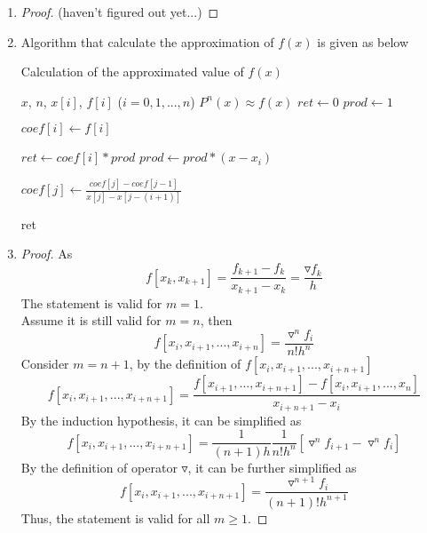 \documentclass[paper=a4, fontsize=11pt]{scrartcl} %
\numberwithin{equation}{section} %
\numberwithin{figure}{section} %
\numberwithin{table}{section} %
\begin{document}
\begin{enumerate}
		\item 
			\begin{proof}
				(haven't figured out yet...)
			\end{proof}
		
		\item 
			Algorithm that calculate the approximation of $f(x)$ is given as below
			
			\begin{algorithm}
			\caption{Calculation of the approximated value of $f(x)$}
			\begin{algorithmic}[1]
				\REQUIRE $x$, $n$, $x[i]$, $f[i]$ ($i = 0, 1, ... , n$)
				\ENSURE $P^n(x) \approx f(x)$
				\STATE $ret \gets 0$
				\STATE $prod \gets 1$
				
					\STATE $coef[i] \gets f[i]$
				\ENDFOR

					\STATE $ret \gets coef[i] * prod$
					\STATE $prod \gets prod * (x-x_i)$

						\STATE $coef[j] \gets \frac{coef[j] - coef[j-1]}{x[j] - x[j-(i+1)]}$
					\ENDFOR

				\ENDFOR

				\RETURN ret
			\end{algorithmic}  
			\end{algorithm}
		\item 
			\begin{proof}
				As
				\begin{equation}
					f[x_k, x_{k+1}] = \frac{f_{k+1}-f_k}{x_{k+1} - x_k} = \frac{\triangledown f_k}{h}
				\end{equation}
				The statement is valid for $m = 1$.\\
				Assume it is still valid for $m = n$, then
				\begin{equation}
					f[x_i, x_{i+1}, ... , x_{i+n}] = \frac{\triangledown^n f_i}{n! h^n}
				\end{equation}
				Consider $m = n+1$, by the definition of $f[x_i, x_{i+1}, ... , x_{i+n+1}]$
				\begin{equation}
					f[x_i, x_{i+1}, ... , x_{i+n+1}] = \frac{f[x_{i+1}, ... , x_{i+n+1}]-f[x_i, x_{i+1}, ... , x_n]}{x_{i+n+1} - x_i}
				\end{equation}
				By the induction hypothesis, it can be simplified as
				\begin{equation}
					f[x_i, x_{i+1}, ... , x_{i+n+1}] = \frac{1}{(n+1)h} \frac{1}{n! h^n} [\triangledown^n f_{i+1} - \triangledown^n f_i]
				\end{equation}
				By the definition of operator $\triangledown$, it can be further simplified as
				\begin{equation}
					f[x_i, x_{i+1}, ... , x_{i+n+1}] = \frac{\triangledown^{n+1} f_i}{(n+1)! h^{n+1}}
				\end{equation}
				Thus, the statement is valid for all $m \geq 1$.
				

\end{proof}
\end{enumerate}
\end{document}
